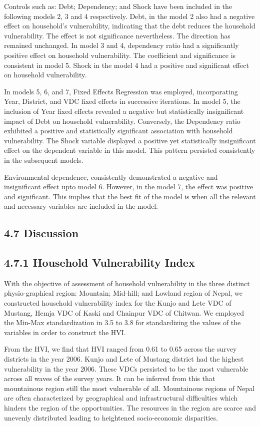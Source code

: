 Controls such as: Debt; Dependency; and Shock have been included in the following models 2, 3 and 4 respectively. Debt, in the model 2 also had a negative effect on household's vulnerability, indicating that the debt reduces the household vulnerability. The effect is not significance nevertheless. The direction has remained unchanged. In model 3 and 4, dependency ratio had a significantly positive effect on household vulnerability. The coefficient and significance is consistent in model 5. Shock in the model 4 had a positive and significant effect on household vulnerability. 

In models 5, 6, and 7, Fixed Effects Regression was employed, incorporating Year, District, and VDC fixed effects in successive iterations. In model 5, the inclusion of Year fixed effects revealed a negative but statistically insignificant impact of Debt on household vulnerability. Conversely, the Dependency ratio exhibited a positive and statistically significant association with household vulnerability. The Shock variable displayed a positive yet statistically insignificant effect on the dependent variable in this model. This pattern persisted consistently in the subsequent models.

Environmental dependence, consistently demonstrated a negative and insignificant effect upto model 6. However, in the model 7, the effect was positive and significant. This implies that the best fit of the model is when all the relevant and necessary variables are included in the model. 

\subsection*{4.7 Discussion}
\renewcommand{\thepage}{\arabic{page}}
\subsection*{4.7.1 Household Vulnerability Index}
With the objective of assessment of household vulnerability in the three distinct physio-graphical region: Mountain; Mid-hill; and Lowland region of Nepal, we constructed household vulnerability index for the Kunjo and Lete VDC of Mustang, Hemja VDC of Kaski and Chainpur VDC of Chitwan. We employed the Min-Max standardization in 3.5 to 3.8 for standardizing the values of the variables in order to construct the HVI. 

From the HVI, we find that HVI ranged from 0.61 to 0.65 across the survey districts in the year 2006. Kunjo and Lete of Mustang district had the highest vulnerability in the year 2006. These VDCs persisted to be the most vulnerable across all waves of the survey years. It can be inferred from this that mountainous region still the most vulnerable of all. Mountainous regions of Nepal are often characterized by geographical and infrastructural difficulties which hinders the region of the opportunities. The resources in the region are scarce and unevenly distributed leading to heightened socio-economic disparities.    


